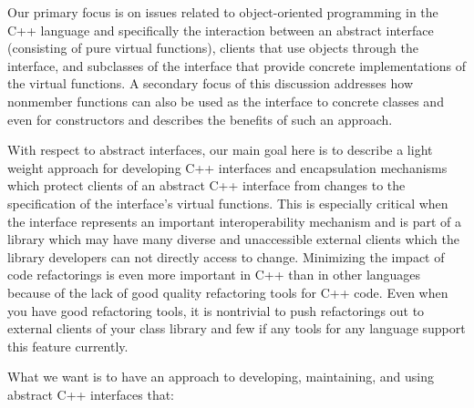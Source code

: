 \documentclass[pdf,ps2pdf,11pt]{SANDreport}
\begin{document}
Our primary focus is on issues related to object-oriented programming in the
C++ language and specifically the interaction between an abstract interface
(consisting of pure virtual functions), clients that use objects through the
interface, and subclasses of the interface that provide concrete
implementations of the virtual functions.  A secondary focus of this
discussion addresses how nonmember functions can also be used as the interface
to concrete classes and even for constructors and describes the benefits of
such an approach.

With respect to abstract interfaces, our main goal here is to describe a light
weight approach for developing C++ interfaces and encapsulation mechanisms
which protect clients of an abstract C++ interface from changes to the
specification of the interface's virtual functions.  This is especially
critical when the interface represents an important interoperability mechanism
and is part of a library which may have many diverse and unaccessible external
clients which the library developers can not directly access to change.
Minimizing the impact of code refactorings is even more important in C++ than
in other languages because of the lack of good quality refactoring tools for
C++ code.  Even when you have good refactoring tools, it is nontrivial to push
refactorings out to external clients of your class library and few if any
tools for any language support this feature currently.

What we want is to have an approach to developing, maintaining, and using
abstract C++ interfaces that:
\end{document}
